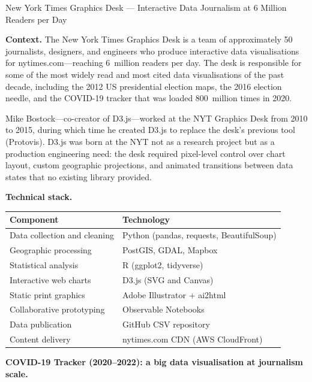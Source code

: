 \begin{casestudy}{New York Times Graphics Desk --- Interactive Data
Journalism at 6 Million Readers per Day}

\textbf{Context.} The New York Times Graphics Desk is a team of
approximately 50 journalists, designers, and engineers who produce
interactive data visualisations for nytimes.com---reaching 6~million
readers per day. The desk is responsible for some of the most widely
read and most cited data visualisations of the past decade, including
the 2012 US presidential election maps, the 2016 election needle, and
the COVID-19 tracker that was loaded 800~million times in 2020.

Mike Bostock---co-creator of D3.js---worked at the NYT Graphics Desk
from 2010 to 2015, during which time he created D3.js to replace the
desk's previous tool (Protovis). D3.js was born at the NYT not as a
research project but as a production engineering need: the desk required
pixel-level control over chart layout, custom geographic projections,
and animated transitions between data states that no existing library
provided.

\medskip
\textbf{Technical stack.}
\begin{center}
\small
\renewcommand{\arraystretch}{1.25}
\begin{tabular}{ll}
  \toprule
  \textbf{Component} & \textbf{Technology} \\
  \midrule
  Data collection and cleaning  & Python (pandas, requests, BeautifulSoup) \\
  Geographic processing         & PostGIS, GDAL, Mapbox \\
  Statistical analysis          & R (ggplot2, tidyverse) \\
  Interactive web charts        & D3.js (SVG and Canvas) \\
  Static print graphics         & Adobe Illustrator + ai2html \\
  Collaborative prototyping     & Observable Notebooks \\
  Data publication              & GitHub CSV repository \\
  Content delivery              & nytimes.com CDN (AWS CloudFront) \\
  \bottomrule
\end{tabular}
\end{center}

\medskip
\textbf{COVID-19 Tracker (2020--2022): a big data visualisation at journalism scale.}


\end{casestudy}
